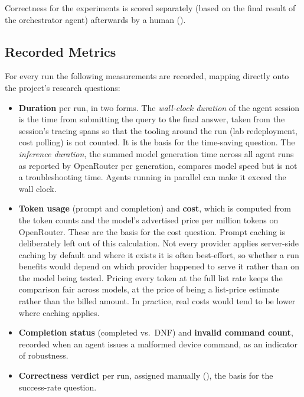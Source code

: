 Correctness for the experiments is scored separately (based on the final result of the orchestrator agent)
afterwards by a human ().

\subsection{Recorded Metrics}
\label{sec:metrics}
For every run the following measurements are recorded, mapping directly onto the project's research
questions:

\begin{itemize}
    \item \textbf{Duration} per run, in two forms. The \emph{wall-clock duration} of the agent
          session is the time from submitting the query to the final answer, taken from the session's
          tracing spans so that the tooling around the run (lab redeployment, cost polling) is
          not counted. It is the basis for the time-saving question. The \emph{inference
          duration}, the summed model generation time across all agent runs as reported by
          OpenRouter per generation, compares model speed but is not a troubleshooting time.
          Agents running in parallel can make it exceed the wall clock.
    \item \textbf{Token usage} (prompt and completion) and \textbf{cost}, which is computed from the
          token counts and the model's advertised price per million tokens on OpenRouter. These are the basis for the cost question.
          Prompt caching is deliberately left out of this calculation. Not every provider applies
          server-side caching by default and where it exists it is often best-effort, so whether a
          run benefits would depend on which provider happened to serve it rather than on the model
          being tested. Pricing every token at the full list rate keeps the comparison fair across
          models, at the price of being a list-price estimate rather than the billed amount.
          In practice, real costs would tend to be lower where caching applies.
    \item \textbf{Completion status} (completed vs.\ DNF) and \textbf{invalid command count}, recorded
          when an agent issues a malformed device command, as an indicator of robustness.
    \item \textbf{Correctness verdict} per run, assigned manually (), the
          basis for the success-rate question.
\end{itemize}

